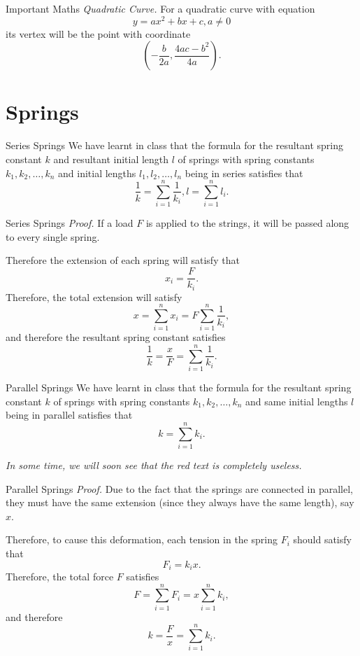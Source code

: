 \documentclass{beamer}
\begin{document}
    \begin{frame}{Important Maths}
        \textit{Quadratic Curve.} For a quadratic curve with equation
        \[y = ax^2 + bx + c, a \neq 0\]
        its vertex will be the point with coordinate
        \[
            \left(-\frac{b}{2a}, \frac{4ac-b^2}{4a}\right).
        \]
    \end{frame}

    \section{Springs}

    \begin{frame}{Series Springs}
        We have learnt in class that the formula for the resultant spring constant \(k\) and resultant initial length \(l\) of springs with spring constants \(k_1, k_2, \ldots, k_n\) and initial lengths \(l_1, l_2, \ldots, l_n\) being in series satisfies that\pause
        \[\frac{1}{k} = \sum_{i = 1}^{n} \frac{1}{k_i}, l = \sum_{i = 1}^{n} l_i.\]
    \end{frame}

    \begin{frame}{Series Springs}
        \textit{Proof.} If a load \(F\) is applied to the strings, it will be passed along to every single spring. \pause

        Therefore the extension of each spring will satisfy that
        \[
            x_i = \frac{F}{k_i}.
        \]
        \pause
        Therefore, the total extension will satisfy
        \[
            x = \sum_{i = 1}^{n} x_i = F \sum_{i = 1}^{n} \frac{1}{k_i},
        \]
        \pause
        and therefore the resultant spring constant satisfies
        \[
            \frac{1}{k} = \frac{x}{F} = \sum_{i = 1}^{n} \frac{1}{k_i}.
        \]
    \end{frame}

    \begin{frame}{Parallel Springs}
        We have learnt in class that the formula for the resultant spring constant \(k\) of springs with spring constants \(k_1, k_2, \ldots, k_n\) and \alert{same initial lengths} \(l\) being in parallel satisfies that\pause
        \[k = \sum_{i = 1}^{n} k_i.\]

        \pause
        \textit{In some time, we will soon see that the red text is completely useless.}
    \end{frame}

    \begin{frame}{Parallel Springs}
        \textit{Proof.} Due to the fact that the springs are connected in parallel, they must have the same extension (since they always have the same length), say \(x\). \pause
        
        Therefore, to cause this deformation, each tension in the spring \(F_i\) should satisfy that
        \[
            F_i = k_i x.
        \]
        \pause
        Therefore, the total force \(F\) satisfies
        \[
            F = \sum_{i = 1}^{n} F_i = x \sum_{i = 1}^{n} k_i,
        \]
        \pause
        and therefore
        \[
            k = \frac{F}{x} = \sum_{i = 1}^{n} k_i.
        \]
    \end{frame}
\end{document}
